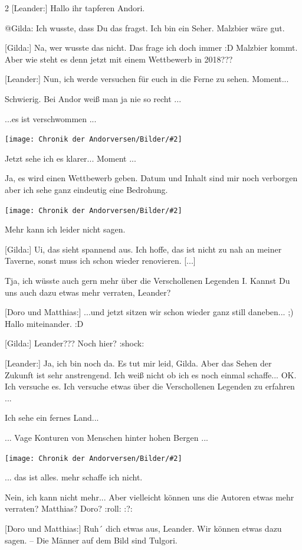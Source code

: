 \documentclass[10pt, a4paper, oneside]{book}
\newcommand{\bildmitts}[2][height=0.32\textwidth,width=0.48\textwidth,keepaspectratio]{%
    \begin{center}
        \texttt{[image: Chronik der Andorversen/Bilder/\#2]}
    \end{center}
}
\begin{document}
\begin{multicols}{2}
[Leander:] Hallo ihr tapferen Andori.

@Gilda: Ich wusste, dass Du das fragst. Ich bin ein Seher. Malzbier wäre gut.

[Gilda:] Na, wer wusste das nicht. Das frage ich doch immer :D
Malzbier kommt. Aber wie steht es denn jetzt mit einem Wettbewerb in 2018???

[Leander:] Nun, ich werde versuchen für euch in die Ferne zu sehen. Moment...

Schwierig. Bei Andor weiß man ja nie so recht ...

...es ist verschwommen ...

\bildmitts{Online-Tavernen-Weihnachts-Party 2017 2.jpeg}

Jetzt sehe ich es klarer... Moment ...

Ja, es wird einen Wettbewerb geben. Datum und Inhalt sind mir noch verborgen aber ich sehe ganz eindeutig eine Bedrohung.

\bildmitts{Online-Tavernen-Weihnachts-Party 2017 3.jpeg}

Mehr kann ich leider nicht sagen.

[Gilda:] Ui, das sieht spannend aus. Ich hoffe, das ist nicht zu nah an meiner Taverne, sonst muss ich schon wieder renovieren. [...]

Tja, ich wüsste auch gern mehr über die Verschollenen Legenden I.
Kannst Du uns auch dazu etwas mehr verraten, Leander?

[Doro und Matthias:] ...und jetzt sitzen wir schon wieder ganz still daneben... ;)
Hallo miteinander. :D

[Gilda:] Leander??? Noch hier? :shock:


[Leander:] Ja, ich bin noch da. Es tut mir leid, Gilda. Aber das Sehen der Zukunft ist sehr anstrengend. Ich weiß nicht ob ich es noch einmal schaffe... OK. Ich versuche es. Ich versuche etwas über die Verschollenen Legenden zu erfahren ...

Ich sehe ein fernes Land...

... Vage Konturen von Menschen hinter hohen Bergen ...

\bildmitts{Leander sieht Verschollene Legenden (2017).jpg}

... das ist alles. mehr schaffe ich nicht.

Nein, ich kann nicht mehr... Aber vielleicht können uns die Autoren etwas mehr verraten? Matthias? Doro? :roll: :?:

[Doro und Matthias:] Ruh´ dich etwas aus, Leander. Wir können etwas dazu sagen.
– Die Männer auf dem Bild sind Tulgori.


\end{multicols}
\end{document}
